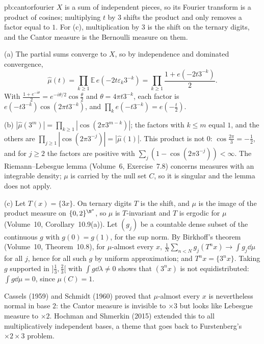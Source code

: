 \begin{solution}{pb:cantorfourier}
\idea $X$ is a sum of independent pieces, so its Fourier transform is a product of cosines; multiplying $t$ by $3$ shifts the product and only removes a factor
equal to $1$. For (c), multiplication by $3$ is the shift on the ternary digits, and the Cantor measure is the Bernoulli measure on them.

\writeup (a) The partial sums converge to $X$, so by independence and dominated convergence,
\[
\hat\mu(t)=\prod_{k\ge1}\mathbb E\,e(-2t\varepsilon_k3^{-k})=\prod_{k\ge1}\frac{1+e(-2t3^{-k})}2.
\]
With $\frac{1+e^{-i\theta}}2=e^{-i\theta/2}\cos\frac\theta2$ and $\theta=4\pi t3^{-k}$,
each factor is $e(-t3^{-k})\cos(2\pi t3^{-k})$, and $\prod_ke(-t3^{-k})=e(-\frac t2)$.

(b) $|\hat\mu(3^m)|=\prod_{k\ge1}|\cos(2\pi3^{m-k})|$; the factors with $k\le m$ equal $1$, and the others are $\prod_{j\ge1}|\cos(2\pi3^{-j})|=|\hat\mu(1)|$. This product
is not $0$: $\cos\frac{2\pi}3=-\frac12$, and for $j\ge2$ the factors are positive with $\sum_j(1-\cos(2\pi3^{-j}))<\infty$. The Riemann--Lebesgue lemma (Volume~6,
Exercise~7.8) concerns measures with an integrable density; $\mu$ is carried by the null set $C$, so it is singular and the lemma does not apply.

(c) Let $T(x)=\{3x\}$. On ternary digits $T$ is the shift, and $\mu$ is the image of the product measure on $\{0,2\}^{\N^*}$, so $\mu$ is $T$-invariant and $T$ is
ergodic for $\mu$ (Volume~10, Corollary~10.9(a)). Let $(g_j)$ be a countable dense subset of the continuous $g$ with $g(0)=g(1)$, for the sup norm. By Birkhoff's theorem
(Volume~10, Theorem~10.8), for $\mu$-almost every $x$, $\frac1N\sum_{n<N}g_j(T^nx)\to\int g_j\dd\mu$ for all $j$, hence for all such $g$ by uniform approximation; and $T^nx=\{3^nx\}$. Taking
$g$ supported in $]\frac13,\frac23[$ with $\int g\dd\lambda\ne0$ shows that $(3^nx)$ is not equidistributed: $\int g\dd\mu=0$, since $\mu(C)=1$.

\leads Cassels (1959) and Schmidt (1960) proved that $\mu$-almost every $x$ is nevertheless normal in base $2$: the Cantor measure is invisible to $\times3$ but
looks like Lebesgue measure to $\times2$. Hochman and Shmerkin (2015) extended this to all multiplicatively independent bases, a theme that goes back to
Furstenberg's $\times2\times3$ problem.
\end{solution}

